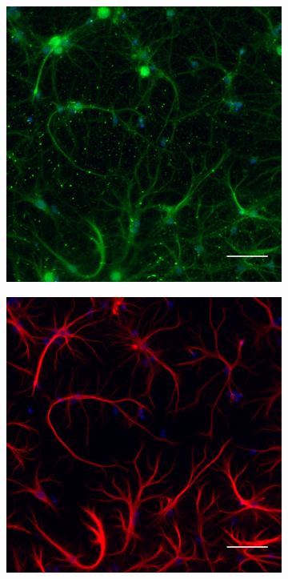	\clearpage	
	\begin{figure}
		\begin{subfigure}[h]{0.329\textwidth}
			\caption{}
			\label{fig:CultureMGmusk}
			\includegraphics[width=\textwidth]{./Images/Immuno/Musk/Cultures/MuSK_50um.jpg}
		\end{subfigure}
		\begin{subfigure}[h]{0.329\textwidth}
			\caption{}
			\label{fig:CultureMGgfap}
			\includegraphics[width=\textwidth]{./Images/Immuno/Musk/Cultures/GFAP_50um.jpg}

\end{subfigure}
\end{figure}
